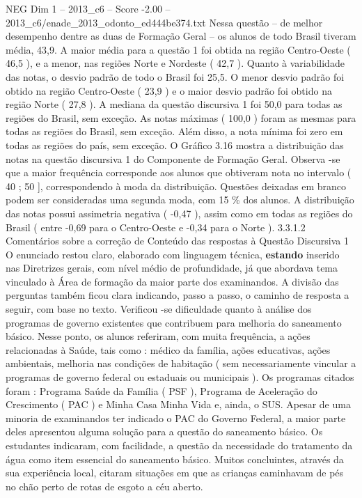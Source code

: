 \begin{textsample}{NEG Dim 1 – 2013\_c6 – Score -2.00 – 2013\_c6/enade\_2013\_odonto\_ed444be374.txt}
Nessa questão – de melhor desempenho dentre as duas de Formação Geral – os alunos de todo Brasil tiveram média, 43,9.
A maior média para a questão 1 foi obtida na região Centro-Oeste ( 46,5 ), e a menor, nas regiões Norte e Nordeste ( 42,7 ).
Quanto à variabilidade das notas, o desvio padrão de todo o Brasil foi 25,5.
O menor desvio padrão foi obtido na região Centro-Oeste ( 23,9 ) e o maior desvio padrão foi obtido na região Norte ( 27,8 ).
A mediana da questão discursiva 1 foi 50,0 para todas as regiões do Brasil, sem exceção.
As notas máximas ( 100,0 ) foram as mesmas para todas as regiões do Brasil, sem exceção.
Além disso, a nota mínima foi zero em todas as regiões do país, sem exceção.
O Gráfico 3.16 mostra a distribuição das notas na questão discursiva 1 do Componente de Formação Geral.
Observa -se que a maior frequência corresponde aos alunos que obtiveram nota no intervalo ( 40 ; 50 ], correspondendo à moda da distribuição.
Questões deixadas em branco podem ser consideradas uma segunda moda, com 15 \% dos alunos.
A distribuição das notas possui assimetria negativa ( -0,47 ), assim como em todas as regiões do Brasil ( entre -0,69 para o Centro-Oeste e -0,34 para o Norte ). 3.3.1.2 Comentários sobre a correção de Conteúdo das respostas à Questão Discursiva 1 O enunciado restou claro, elaborado com linguagem técnica, \textbf{estando} inserido nas Diretrizes gerais, com nível médio de profundidade, já que abordava tema vinculado à Área de formação da maior parte dos examinandos.
A divisão das perguntas também ficou clara indicando, passo a passo, o caminho de resposta a seguir, com base no texto.
Verificou -se dificuldade quanto à análise dos programas de governo existentes que contribuem para melhoria do saneamento básico.
Nesse ponto, os alunos referiram, com muita frequência, a ações relacionadas à Saúde, tais como : médico da família, ações educativas, ações ambientais, melhoria nas condições de habitação ( sem necessariamente vincular a programas de governo federal ou estaduais ou municipais ).
Os programas citados foram : Programa Saúde da Família ( PSF ), Programa de Aceleração do Crescimento ( PAC ) e Minha Casa Minha Vida e, ainda, o SUS.
Apesar de uma minoria de examinandos ter indicado o PAC do Governo Federal, a maior parte deles apresentou alguma solução para a questão do saneamento básico.
Os estudantes indicaram, com facilidade, a questão da necessidade do tratamento da água como item essencial do saneamento básico.
Muitos concluintes, através da sua experiência local, citaram situações em que as crianças caminhavam de pés no chão perto de rotas de esgoto a céu aberto.

\end{textsample}
